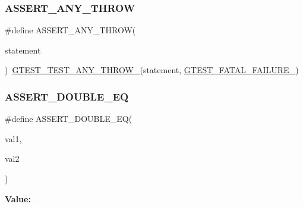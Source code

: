 \subsubsection{\texorpdfstring{ASSERT\_ANY\_THROW}{ASSERT\_ANY\_THROW}}
{\footnotesize\ttfamily \#define A\+S\+S\+E\+R\+T\+\_\+\+A\+N\+Y\+\_\+\+T\+H\+R\+OW(\begin{DoxyParamCaption}\item[{}]{statement }\end{DoxyParamCaption})~\mbox{\hyperlink{_obj__test_2lib_2googletest-release-1_88_81_2googletest_2include_2gtest_2internal_2gtest-internal_8h_af48bbd26d54d4afc5e4cef39b1c76ba3}{G\+T\+E\+S\+T\+\_\+\+T\+E\+S\+T\+\_\+\+A\+N\+Y\+\_\+\+T\+H\+R\+O\+W\+\_\+}}(statement, \mbox{\hyperlink{_obj__test_2lib_2googletest-release-1_88_81_2googletest_2include_2gtest_2internal_2gtest-internal_8h_a0f9a4c3ea82cc7bf4478eaffdc168358}{G\+T\+E\+S\+T\+\_\+\+F\+A\+T\+A\+L\+\_\+\+F\+A\+I\+L\+U\+R\+E\+\_\+}})}

\mbox{\label{googletest-master_2googletest_2include_2gtest_2gtest_8h_a6617da62e5ae5490995a3bfca1f331a9}} 
\subsubsection{\texorpdfstring{ASSERT\_DOUBLE\_EQ}{ASSERT\_DOUBLE\_EQ}}
{\footnotesize\ttfamily \#define A\+S\+S\+E\+R\+T\+\_\+\+D\+O\+U\+B\+L\+E\+\_\+\+EQ(\begin{DoxyParamCaption}\item[{}]{val1,  }\item[{}]{val2 }\end{DoxyParamCaption})}

{\bfseries Value\+:}
\begin{DoxyCode}{0}

\end{DoxyCode}
\mbox{\label{googletest-master_2googletest_2include_2gtest_2gtest_8h_a1a6db8b1338ee7040329322b77779086}} 
